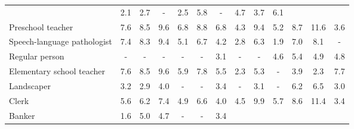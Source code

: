 \begin{table*}[p]
{\begin{tabular}{l|ccc|ccc|ccc|ccc}
& \cellcolor{orange1} 2.1 & \cellcolor{orange1} 2.7 & \cellcolor{lightgray} -
& \cellcolor{orange1} 2.5 & \cellcolor{orange2} 5.8 & \cellcolor{lightgray} -
& \cellcolor{orange2} 4.7 & \cellcolor{orange1} 3.7 & \cellcolor{blue2} 6.1
\\
Preschool teacher
& \cellcolor{orange3} 7.6 & \cellcolor{orange3} 8.5 & \cellcolor{orange4} 9.6
& \cellcolor{orange3} 6.8 & \cellcolor{orange3} 8.8 & \cellcolor{orange3} 6.8
& \cellcolor{orange2} 4.3 & \cellcolor{orange4} 9.4 & \cellcolor{orange2} 5.2
& \cellcolor{orange3} 8.7 & \cellcolor{orange4} 11.6 & \cellcolor{orange1} 3.6
\\
Speech-language pathologist
& \cellcolor{orange3} 7.4 & \cellcolor{orange3} 8.3 & \cellcolor{orange4} 9.4
& \cellcolor{orange2} 5.1 & \cellcolor{orange3} 6.7 & \cellcolor{orange2} 4.2
& \cellcolor{orange1} 2.8 & \cellcolor{orange2} 6.3 & \cellcolor{orange1} 1.9
& \cellcolor{orange3} 7.0 & \cellcolor{orange3} 8.1 & \cellcolor{lightgray} -
\\
Regular person
& \cellcolor{lightgray} - & \cellcolor{lightgray} - & \cellcolor{lightgray} -
& \cellcolor{lightgray} - & \cellcolor{lightgray} - & \cellcolor{blue1} 3.1
& \cellcolor{lightgray} - & \cellcolor{lightgray} - & \cellcolor{blue2} 4.6
& \cellcolor{orange2} 5.4 & \cellcolor{orange2} 4.9 & \cellcolor{blue2} 4.8
\\
Elementary school teacher
& \cellcolor{orange3} 7.6 & \cellcolor{orange3} 8.5 & \cellcolor{orange4} 9.6
& \cellcolor{orange2} 5.9 & \cellcolor{orange3} 7.8 & \cellcolor{orange2} 5.5
& \cellcolor{orange1} 2.3 & \cellcolor{orange2} 5.3 & \cellcolor{lightgray} -
& \cellcolor{orange2} 3.9 & \cellcolor{orange1} 2.3 & \cellcolor{blue3} 7.7
\\
Landscaper
& \cellcolor{orange1} 3.2 & \cellcolor{orange1} 2.9 & \cellcolor{orange2} 4.0
& \cellcolor{lightgray} - & \cellcolor{lightgray} - & \cellcolor{blue1} 3.4
& \cellcolor{lightgray} - & \cellcolor{orange1} 3.1 & \cellcolor{lightgray} -
& \cellcolor{orange2} 6.2 & \cellcolor{orange2} 6.5 & \cellcolor{blue1} 3.0
\\
Clerk
& \cellcolor{orange2} 5.6 & \cellcolor{orange2} 6.2 & \cellcolor{orange3} 7.4
& \cellcolor{orange2} 4.9 & \cellcolor{orange3} 6.6 & \cellcolor{orange2} 4.0
& \cellcolor{orange2} 4.5 & \cellcolor{orange4} 9.9 & \cellcolor{orange2} 5.7
& \cellcolor{orange3} 8.6 & \cellcolor{orange4} 11.4 & \cellcolor{orange1} 3.4
\\
Banker
& \cellcolor{blue1} 1.6 & \cellcolor{blue2} 5.0 & \cellcolor{blue2} 4.7
& \cellcolor{lightgray} - & \cellcolor{lightgray} - & \cellcolor{blue1} 3.4

\end{tabular}}
\end{table*}
